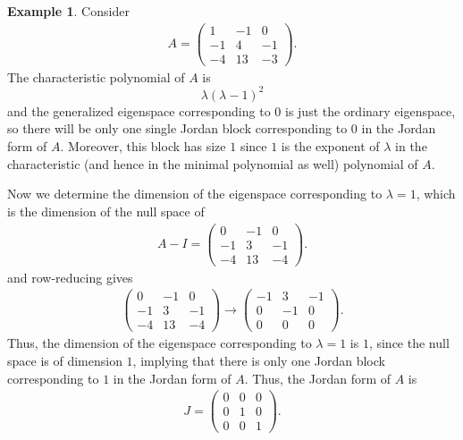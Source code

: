 \documentclass[11pt]{book}
\theoremstyle{definition}
\newtheorem{example}{Example}[section]
\numberwithin{equation}{chapter}
\begin{document}
\medskip

\begin{example}
Consider 
\begin{align*}
    A = \begin{pmatrix}
    1 & -1 & 0 \\
    -1 & 4 &  -1 \\
    -4 & 13 & -3 
    \end{pmatrix}.
\end{align*}
The characteristic polynomial of $A$ is 
$$\lambda(\lambda-1)^2$$
and the generalized eigenspace corresponding to $0$ is just the ordinary eigenspace, so there will be only one single Jordan block corresponding to $0$ in the Jordan form of $A$. Moreover, this block has size $1$ since $1$ is the exponent of $\lambda$ in the characteristic (and hence in the minimal polynomial as well) polynomial of $A$.

Now we determine the dimension of the eigenspace corresponding to $\lambda = 1$, which is the dimension of the null space of
\begin{align*}
    A - I = \begin{pmatrix}
    0 & -1 & 0 \\
    -1 & 3 &  -1 \\
    -4 & 13 & -4 
    \end{pmatrix}.
\end{align*}
and row-reducing gives
\begin{align*}
    \begin{pmatrix}
    0 & -1 & 0 \\
    -1 & 3 &  -1 \\
    -4 & 13 & -4 
    \end{pmatrix} \to \begin{pmatrix}
    -1 & 3 &  -1 \\
    0 & -1 & 0 \\
    0 & 0 & 0 
    \end{pmatrix}.
\end{align*}
Thus, the dimension of the eigenspace corresponding to $\lambda = 1$ is $1$, since the null space is of dimension $1$, implying that there is only one Jordan block corresponding to $1$ in the Jordan form of $A$. Thus, the Jordan form of $A$ is
\begin{align*}
    J = \begin{pmatrix}
    0 & 0 &  0 \\
    0 & 1 & 0 \\
    0 & 0 & 1
    \end{pmatrix}.
\end{align*}
\end{example}
\end{document}
